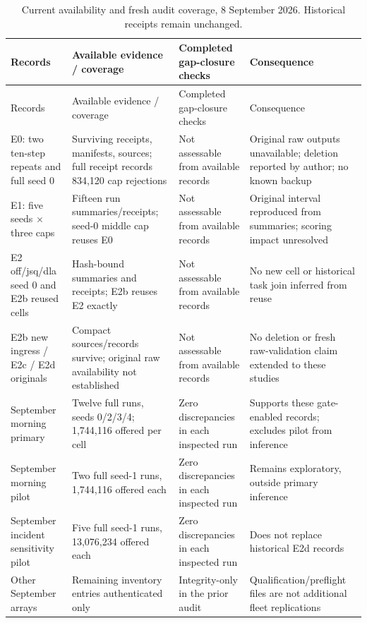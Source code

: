 \documentclass[11pt,a4paper]{article}
\begin{document}
\begingroup
\small
\begin{xltabular}{\textwidth}{@{}YYYY@{}}
\caption{Current availability and fresh audit coverage, 8 September 2026. Historical receipts remain unchanged.}\label{tab:B1} \\
\toprule
Records & Available evidence / coverage & Completed gap-closure checks & Consequence \\
\midrule\endfirsthead
\toprule
Records & Available evidence / coverage & Completed gap-closure checks & Consequence \\
\midrule\endhead
\bottomrule\endfoot
E0: two ten-step repeats and full seed 0 & Surviving receipts, manifests, sources; full receipt records 834,120 cap rejections & Not assessable from available records & Original raw outputs unavailable; deletion reported by author; no known backup \\
E1: five seeds \ensuremath{\times} three caps & Fifteen run summaries/receipts; seed-0 middle cap reuses E0 & Not assessable from available records & Original interval reproduced from summaries; scoring impact unresolved \\
E2 off/jsq/dla seed 0 and E2b reused cells & Hash-bound summaries and receipts; E2b reuses E2 exactly & Not assessable from available records & No new cell or historical task join inferred from reuse \\
E2b new ingress / E2c / E2d originals & Compact sources/records survive; original raw availability not established & Not assessable from available records & No deletion or fresh raw-validation claim extended to these studies \\
September morning primary & Twelve full runs, seeds 0/2/3/4; 1,744,116 offered per cell & Zero discrepancies in each inspected run & Supports these gate-enabled records; excludes pilot from inference \\
September morning pilot & Two full seed-1 runs, 1,744,116 offered each & Zero discrepancies in each inspected run & Remains exploratory, outside primary inference \\
September incident sensitivity pilot & Five full seed-1 runs, 13,076,234 offered each & Zero discrepancies in each inspected run & Does not replace historical E2d records \\
Other September arrays & Remaining inventory entries authenticated only & Integrity-only in the prior audit & Qualification/preflight files are not additional fleet replications \\
\end{xltabular}
\endgroup
\end{document}
